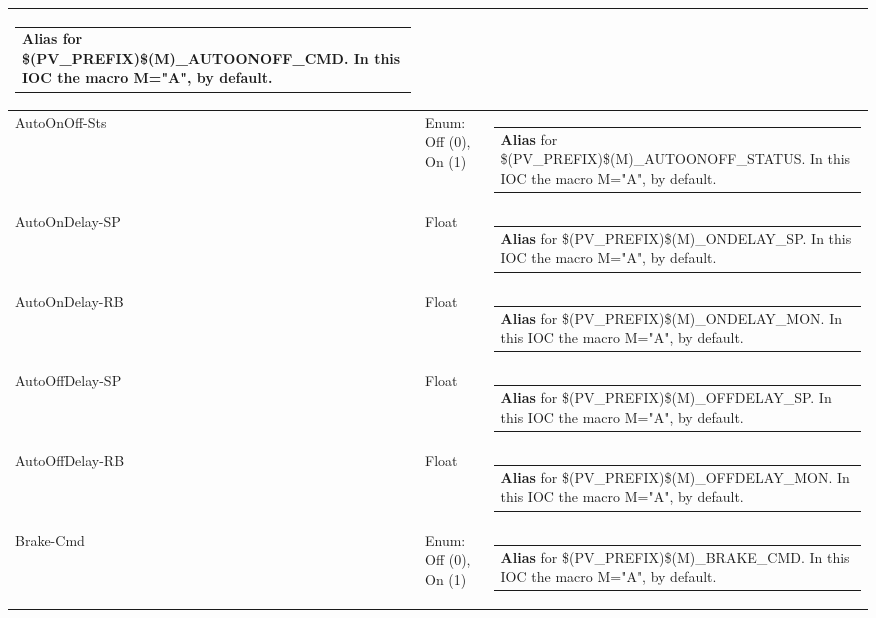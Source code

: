 \documentclass[openany]{article}
\begin{document}
\begin{longtable}{| m{4.5cm} m{2.5cm}  m{8.5cm} |}
\begin{tabular}{@{}m{6cm}@{}}
                \textbf{\color{blue} Alias} for \$(PV\_PREFIX)\$(M)\_AUTOONOFF\_CMD. In this IOC the macro M="A", by default.
            \end{tabular} \hypertarget{}{}\\ \hline
        AutoOnOff-Sts & Enum: Off (0), On (1) & \begin{tabular}{@{}m{6cm}@{}}
                \textbf{\color{blue} Alias} for \$(PV\_PREFIX)\$(M)\_AUTOONOFF\_STATUS. In this IOC the macro M="A", by default.
            \end{tabular} \hypertarget{pv:auto-on-delay}{}\\ \hline
        AutoOnDelay-SP & Float & \begin{tabular}{@{}m{6cm}@{}}
                \textbf{\color{blue} Alias} for \$(PV\_PREFIX)\$(M)\_ONDELAY\_SP. In this IOC the macro M="A", by default.
            \end{tabular} \hypertarget{}{}\\ \hline
        AutoOnDelay-RB & Float & \begin{tabular}{@{}m{6cm}@{}}
                \textbf{\color{blue} Alias} for \$(PV\_PREFIX)\$(M)\_ONDELAY\_MON. In this IOC the macro M="A", by default.
            \end{tabular} \hypertarget{pv:auto-off-delay}{}\\ \hline
        AutoOffDelay-SP & Float & \begin{tabular}{@{}m{6cm}@{}}
                \textbf{\color{blue} Alias} for \$(PV\_PREFIX)\$(M)\_OFFDELAY\_SP. In this IOC the macro M="A", by default.
            \end{tabular} \hypertarget{}{}\\ \hline
        AutoOffDelay-RB & Float & \begin{tabular}{@{}m{6cm}@{}}
                \textbf{\color{blue} Alias} for \$(PV\_PREFIX)\$(M)\_OFFDELAY\_MON. In this IOC the macro M="A", by default.
            \end{tabular} \hypertarget{pv:brake-cmd}{}\\ \hline
        Brake-Cmd & Enum: Off (0), On (1) & \begin{tabular}{@{}m{6cm}@{}}
                \textbf{\color{blue} Alias} for \$(PV\_PREFIX)\$(M)\_BRAKE\_CMD. In this IOC the macro M="A", by default.
            \end{tabular} \hypertarget{pv:brake-mon}{}\\ \hline

\end{longtable}
\end{document}

